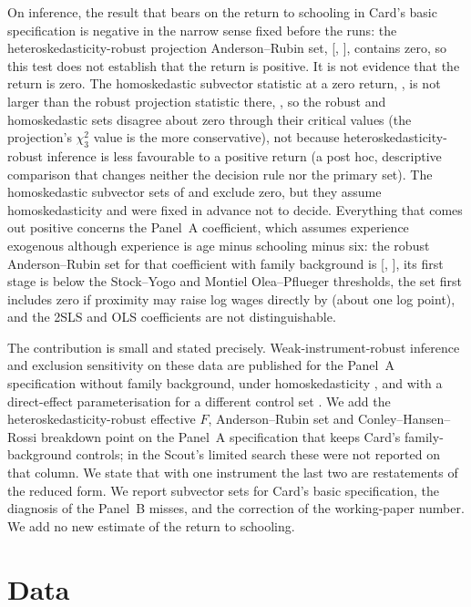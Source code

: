 \documentclass[11pt]{article}
\begin{document}
On inference, the result that bears on the return to schooling in Card's basic
specification is negative in the narrow sense fixed before the runs: the
heteroskedasticity-robust projection Anderson--Rubin set, [\BSixArRobLo,
\BSixArRobHi], contains zero, so this test does not establish that the return is
positive. It is not evidence that the return is zero. The homoskedastic subvector
statistic at a zero return, \BSixHomStatAtZero{}, is not larger than the robust projection
statistic there, \BSixRobMAtZero{}, so the robust and homoskedastic sets disagree about zero
through their critical values (the projection's $\chi^2_3$ value is the more conservative),
not because heteroskedasticity-robust inference is less favourable to a positive return
(a post hoc, descriptive comparison that changes neither the decision rule nor the primary
set). The homoskedastic subvector sets of
\citet{guggenberger2012asymptotic} and \citet{guggenberger2019more} exclude zero, but they
assume homoskedasticity and were fixed in advance not to decide. Everything that comes out
positive concerns the Panel~A coefficient, which assumes experience exogenous although
experience is age minus schooling minus six: the robust Anderson--Rubin set for that
coefficient with family background is [\ASixArLo, \ASixArHi], its first stage is below the
Stock--Yogo and Montiel Olea--Pflueger thresholds, the set first includes zero if
proximity may raise log wages directly by \ASixPacoefChrBreakdown{} (about one log
point), and the 2SLS and OLS coefficients are not distinguishable.

The contribution is small and stated precisely. Weak-instrument-robust inference and
exclusion sensitivity on these data are published for the Panel~A specification without
family background, under homoskedasticity \citep{cinelli2025omitted}, and with a
direct-effect parameterisation for a different control set
\citep{steiner2025possibilistic}. We add the heteroskedasticity-robust effective $F$,
Anderson--Rubin set and Conley--Hansen--Rossi breakdown point on the Panel~A specification
that keeps Card's family-background controls; in the Scout's limited search these were not
reported on that column. We state that with one instrument the last two are restatements
of the reduced form. We report subvector sets for Card's basic specification, the
diagnosis of the Panel~B misses, and the correction of the working-paper number. We add no
new estimate of the return to schooling.

\section{Data}
\label{sec:data}
\end{document}
